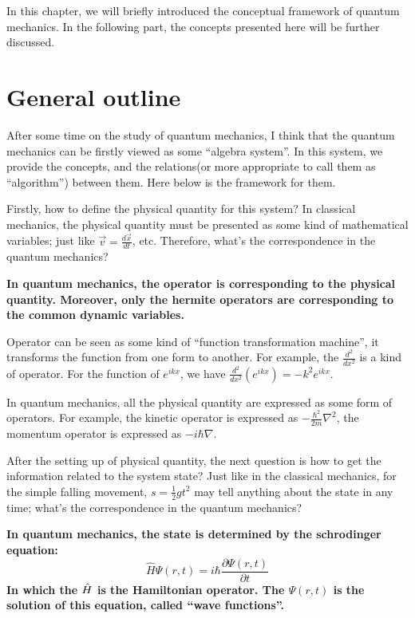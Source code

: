 In this chapter, we will briefly introduced the conceptual framework
of quantum mechanics. In the following part, the concepts presented
here will be further discussed.

\section{General outline}
%
%
After some time on the study of quantum mechanics, I think that the
quantum mechanics can be firstly viewed as some ``algebra system''.
In this system, we provide the concepts, and the relations(or more
appropriate to call them as ``algorithm'') between them. Here below
is the framework for them.

Firstly, how to define the physical quantity for this system? In
classical mechanics, the physical quantity must be presented as some
kind of mathematical variables; just like
$\vec{v}=\frac{d\vec{x}}{dt}$, etc. Therefore, what's the
correspondence in the quantum mechanics?

\begin{law}
\textbf{In quantum mechanics, the operator is corresponding to the
physical quantity. Moreover, only the hermite operators are
corresponding to the common dynamic variables.}
\end{law}

Operator can be seen as some kind of ``function transformation
machine'', it transforms the function from one form to another. For
example, the $\frac{d^{2}}{dx^{2}}$ is a kind of operator. For the
function of $e^{ikx}$, we have $\frac{d^{2}}{dx^{2}} (e^{ikx}) =
-k^{2}e^{ikx}$.

In quantum mechanics, all the physical quantity are expressed as
some form of operators. For example, the kinetic operator is
expressed as $-\frac{\hbar^{2}}{2m}\nabla^{2}$, the momentum
operator is expressed as $-i\hbar\nabla$.

After the setting up of physical quantity, the next question is how
to get the information related to the system state? Just like in the
classical mechanics, for the simple falling movement, $s =
\frac{1}{2}gt^{2}$ may tell anything about the state in any time;
what's the correspondence in the quantum mechanics?

\begin{law}
\textbf{In quantum mechanics, the state is determined by the
schrodinger equation:
\begin{equation}
\hat{H}\Psi(r,t) = i \hbar \frac{\partial \Psi(r,t)}{\partial t}
\end{equation}
In which the $\Hat{H}$ is the Hamiltonian operator. The $\Psi(r,t)$
is the solution of this equation, called ``wave functions''.}
\end{law}

